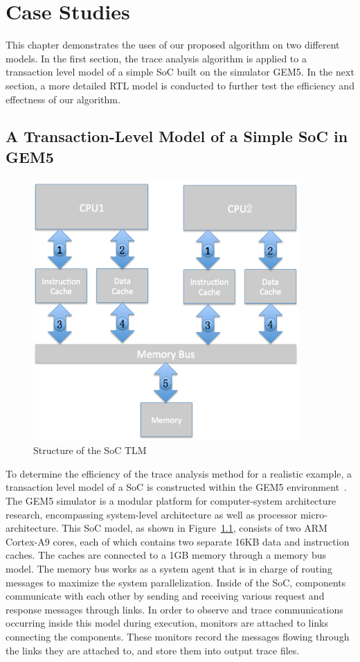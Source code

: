 \documentclass[12pt,frontmatter,copyright,thesis]{usfmanus}
\begin{document}
\chapter{Case Studies}
This chapter demonstrates the uses of our proposed
algorithm on two different models. In the
first section, the trace analysis algorithm is applied to
a transaction level model of a simple SoC
built on the simulator GEM5. 
In the next section, 
a more detailed RTL model is conducted to
further test the efficiency and effectness of our algorithm.

\section{A Transaction-Level Model of a Simple SoC in GEM5}
\begin{figure} 
\centerline{
\includegraphics[width=4in]{Gem5.png}}
\caption{Structure of the SoC TLM}
\label{SoC}
\end{figure}

To determine the efficiency of the trace analysis method for
a realistic example, a transaction level model of a SoC is
constructed within the GEM5 environment~\cite{Binkert2011}.
The GEM5 simulator is a modular platform for computer-system architecture research, 
encompassing system-level architecture as well as processor micro-architecture.
This SoC model, as shown in Figure~\ref{SoC}, consists of two
ARM Cortex-A9 cores, each of which contains two separate
16KB data and instruction caches.  The caches are connected
to a 1GB memory through a memory bus model. 
The memory bus works as a system agent that is
in charge of routing messages to maximize the system
parallelization.
Inside of the SoC,
components communicate with each other by
sending and receiving various
request and response messages through links.  In order to observe and
trace communications occurring inside this model during
execution, monitors are attached to links connecting the
components. 
These monitors record the messages flowing
through the links they are attached to, and store them into
output trace files.
\end{document}
